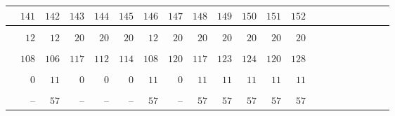 \documentclass{amsart}
\theoremstyle{plain}
\theoremstyle{definition}
\theoremstyle{remark}
\begin{document}
{\begin{longtable}{rrrrrrrrrrrrrrrrrrrrr}
& $141$ & $142$ & $143$ & $144$ & $145$ & $146$ & $147$ & $148$ & $149$ & $150$ & $151$ & $152$\\\hline
\vspace*{-3mm}\\
& $12$ & $12$ & $20$ & $20$ & $20$ & $12$ & $20$ & $20$ & $20$ & $20$ & $20$ & $20$\\
\vspace*{-3mm}\\
& $108$ & $106$ & $117$ & $112$ & $114$ & $108$ & $120$ & $117$ & $123$ & $124$ & $120$ & $128$\\
\vspace*{-3mm}\\
& $0$ & $11$ & $0$ & $0$ & $0$ & $11$ & $0$ & $11$ & $11$ & $11$ & $11$ & $11$\\
\vspace*{-3mm}\\
& -- & $57$ & -- & -- & -- & $57$ & -- & $57$ & $57$ & $57$ & $57$ & $57$
\end{longtable}
}
\end{document}
